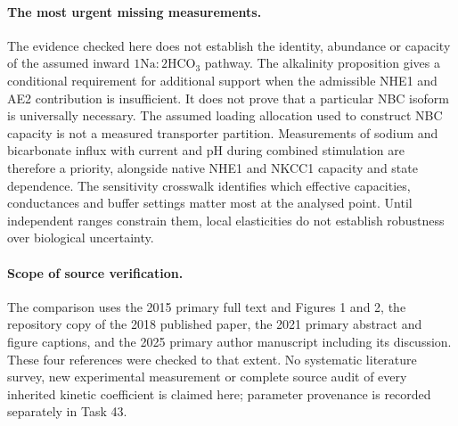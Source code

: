 \paragraph{The most urgent missing measurements.}
The evidence checked here does not establish the identity, abundance
or capacity of the assumed inward $1\mathrm{Na}:2\mathrm{HCO}_3$
pathway. The alkalinity proposition gives a conditional requirement for
additional support when the admissible NHE1 and AE2 contribution is
insufficient. It does not prove that a particular NBC isoform is
universally necessary. The assumed loading allocation used to construct
NBC capacity is not a measured transporter partition.
Measurements of sodium and bicarbonate influx with current and pH
during combined stimulation are therefore a priority, alongside native
NHE1 and NKCC1 capacity and state dependence. The sensitivity crosswalk
identifies which effective capacities, conductances and buffer settings
matter most at the analysed point. Until independent ranges constrain
them, local elasticities do not establish robustness over biological
uncertainty.

\paragraph{Scope of source verification.}
The comparison uses the 2015 primary full text and Figures 1 and 2,
the repository copy of the 2018 published paper, the 2021 primary
abstract and figure captions, and the 2025 primary author manuscript
including its discussion. These four references were checked to that
extent. No systematic literature survey, new experimental measurement
or complete source audit of every inherited kinetic coefficient is
claimed here; parameter provenance is recorded separately in Task 43.



\clearpage
